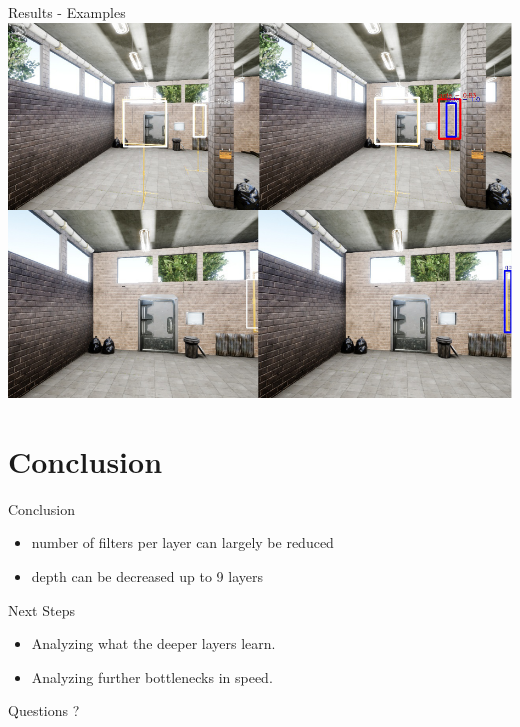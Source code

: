 \documentclass{beamer}
\begin{document}
\begin{darkframes}
    \begin{frame}{Results - Examples}
    	\includegraphics[width=\textwidth]{fig/examples}
	\end{frame}
    
    \section{Conclusion}
    \begin{frame}{Conclusion}

    \begin{itemize}
    	\item number of filters per layer can largely be reduced
    	\item depth can be decreased up to 9 layers
    \end{itemize}
    \end{frame}

    \begin{frame}{Next Steps}
    	\begin{itemize}
    		\item Analyzing what the deeper layers learn.
    		\item Analyzing further bottlenecks in speed.
    	\end{itemize}
    \end{frame}
    

    \begin{frame}{Questions}
    \centering
\huge ?
    	\end{frame}
    
    
  \end{darkframes}
\end{document}
